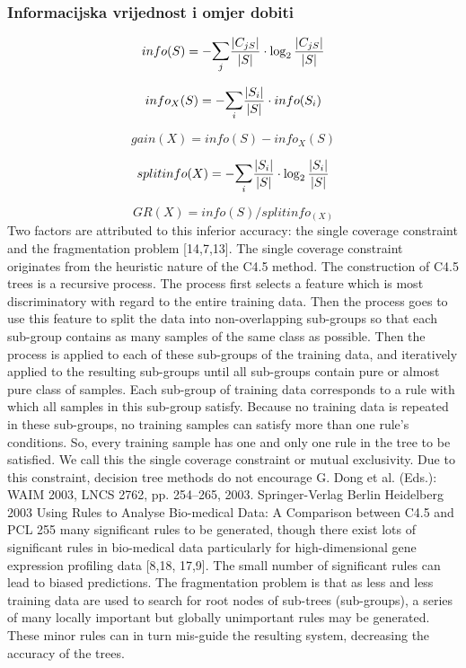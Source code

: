 \subsubsection{Informacijska vrijednost i omjer dobiti}

\begin{equation}
info(S) = -\mathlarger{\sum}_{j}\frac{|C_{jS}|}{|S|}\cdot\log_{2}\frac{|C_{jS}|}{|S|}
\end{equation}

\begin{equation}
info_{X}(S) = -\mathlarger{\sum}_{i}\frac{|S_{i}|}{|S|}\cdot info(S_{i})
\end{equation}

\begin{equation}
gain(X) = info(S)-info_{X}(S)
\end{equation}

\begin{equation}
split info(X) = -\mathlarger{\sum}_{i}\frac{|S_{i}|}{|S|}\cdot\log_{2}\frac{|S_{i}|}{|S|}
\end{equation}

\begin{equation}
GR(X) = info(S)/split info_(X)
\end{equation}
Two factors are attributed
to this inferior accuracy: the single coverage constraint and the fragmentation problem
[14,7,13].
The single coverage constraint originates from the heuristic nature of the C4.5
method. The construction of C4.5 trees is a recursive process. The process first selects
a feature which is most discriminatory with regard to the entire training data. Then
the process goes to use this feature to split the data into non-overlapping sub-groups
so that each sub-group contains as many samples of the same class as possible. Then
the process is applied to each of these sub-groups of the training data, and iteratively
applied to the resulting sub-groups until all sub-groups contain pure or almost pure class
of samples.
Each sub-group of training data corresponds to a rule with which all samples in this
sub-group satisfy. Because no training data is repeated in these sub-groups, no training
samples can satisfy more than one rule’s conditions. So, every training sample has one
and only one rule in the tree to be satisfied. We call this the single coverage constraint
or mutual exclusivity. Due to this constraint, decision tree methods do not encourage
G. Dong et al. (Eds.): WAIM 2003, LNCS 2762, pp. 254–265, 2003. Springer-Verlag Berlin Heidelberg 2003
Using Rules to Analyse Bio-medical Data: A Comparison between C4.5 and PCL 255
many significant rules to be generated, though there exist lots of significant rules in
bio-medical data particularly for high-dimensional gene expression profiling data [8,18,
17,9]. The small number of significant rules can lead to biased predictions.
The fragmentation problem is that as less and less training data are used to search for
root nodes of sub-trees (sub-groups), a series of many locally important but globally unimportant
rules may be generated. These minor rules can in turn mis-guide the resulting
system, decreasing the accuracy of the trees.
